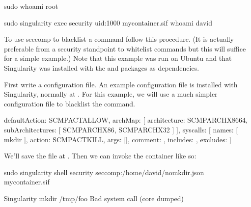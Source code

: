 \documentclass[letterpaper,10pt,english]{sphinxmanual}
\begin{document}
%
\begin{sphinxVerbatim}[commandchars=\\\{\}]
\PYGZdl{} sudo whoami
root

\PYGZdl{} sudo singularity exec \PYGZhy{}\PYGZhy{}security uid:1000 my\PYGZus{}container.sif whoami
david
\end{sphinxVerbatim}

To use seccomp to blacklist a command follow this procedure. (It is actually
preferable from a security standpoint to whitelist commands but this will
suffice for a simple example.)  Note that this example was run on Ubuntu and
that Singularity was installed with the  and 
packages as dependencies.

First write a configuration file.  An example configuration file is installed
with Singularity, normally at .
For this example, we will use a much simpler configuration file to blacklist the
 command.

%
\begin{sphinxVerbatim}[commandchars=\\\{\}]
\PYGZob{}
    \PYGZdq{}defaultAction\PYGZdq{}: \PYGZdq{}SCMP\PYGZus{}ACT\PYGZus{}ALLOW\PYGZdq{},
    \PYGZdq{}archMap\PYGZdq{}: [
        \PYGZob{}
            \PYGZdq{}architecture\PYGZdq{}: \PYGZdq{}SCMP\PYGZus{}ARCH\PYGZus{}X86\PYGZus{}64\PYGZdq{},
            \PYGZdq{}subArchitectures\PYGZdq{}: [
                \PYGZdq{}SCMP\PYGZus{}ARCH\PYGZus{}X86\PYGZdq{},
                \PYGZdq{}SCMP\PYGZus{}ARCH\PYGZus{}X32\PYGZdq{}
            ]
        \PYGZcb{}
    ],
    \PYGZdq{}syscalls\PYGZdq{}: [
        \PYGZob{}
            \PYGZdq{}names\PYGZdq{}: [
                \PYGZdq{}mkdir\PYGZdq{}
            ],
            \PYGZdq{}action\PYGZdq{}: \PYGZdq{}SCMP\PYGZus{}ACT\PYGZus{}KILL\PYGZdq{},
            \PYGZdq{}args\PYGZdq{}: [],
            \PYGZdq{}comment\PYGZdq{}: \PYGZdq{}\PYGZdq{},
            \PYGZdq{}includes\PYGZdq{}: \PYGZob{}\PYGZcb{},
            \PYGZdq{}excludes\PYGZdq{}: \PYGZob{}\PYGZcb{}
        \PYGZcb{}
    ]
\PYGZcb{}
\end{sphinxVerbatim}

We’ll save the file at . Then we can invoke the
container like so:

%
\begin{sphinxVerbatim}[commandchars=\\\{\}]
\PYGZdl{} sudo singularity shell \PYGZhy{}\PYGZhy{}security seccomp:/home/david/no\PYGZus{}mkdir.json my\PYGZus{}container.sif

Singularity\PYGZgt{} mkdir /tmp/foo
Bad system call (core dumped)
\end{sphinxVerbatim}
\end{document}
